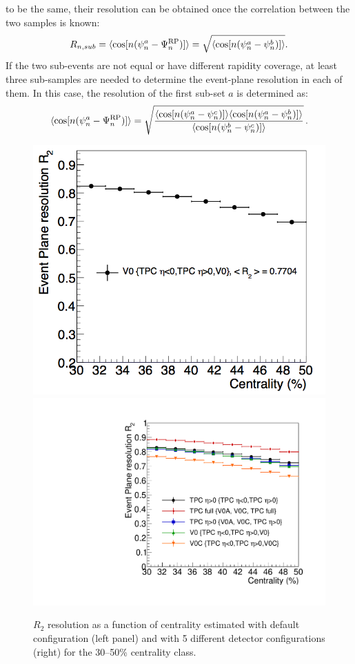 to be the same, their resolution can be obtained 
once the correlation between the two samples is known:
\begin{equation}
R_{n, sub} = \langle {\rm cos} [n({\rm \psi}^a_n-{\rm \Psi}_n^{\rm RP})] \rangle = \sqrt{\langle {\rm cos} [n({\rm \psi}^a_n-{\rm \psi}^b_n)] \rangle}.
\end{equation}
If the two sub-events are not equal or have different rapidity coverage,
at least three sub-samples are needed to determine the 
event-plane resolution in each of them. In this case, 
the resolution of the first sub-set $a$ is determined as:
\begin{equation}
 \langle {\rm cos} [n({\rm \psi}^a_n-{\rm \Psi}_n^{\rm RP})] \rangle = 
\sqrt{\frac{\langle\cos [n(\psi_n^a-\psi_n^c)] \rangle \langle\cos [n(\psi_n^a-\psi_n^b)] \rangle}{\langle\cos [n(\psi_n^b-\psi_n^c)] \rangle}}\, .
\end{equation}

\begin{figure}
\centering
  \includegraphics[width=.49\textwidth]{FigCap5/resoEP3050.png}
  \includegraphics[width=.49\textwidth]{FigCap5/EPresolution_comparison.pdf}
\caption{$R_2$ resolution as a function of centrality estimated with default configuration (left panel) and with 5 different detector configurations (right) for the 30--50\% centrality class.}
\label{fig:resoVsDetConfig}
\end{figure}

